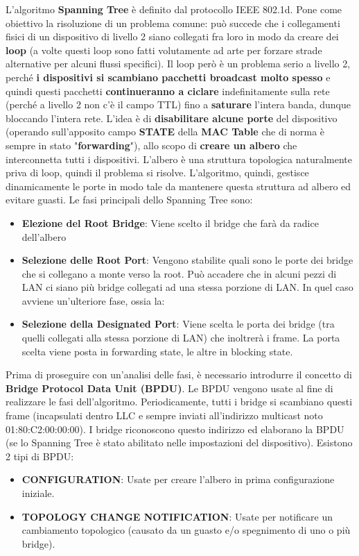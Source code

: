 \documentclass[12pt]{article}
\begin{document}
L'algoritmo \textbf{Spanning Tree} è definito dal protocollo IEEE 802.1d. Pone come obiettivo la risoluzione di un problema comune: può succede che i collegamenti fisici di un dispositivo di livello 2 siano collegati fra loro in modo da creare dei \textbf{loop} (a volte questi loop sono fatti volutamente ad arte per forzare strade alternative per alcuni flussi specifici). Il loop però è un problema serio a livello 2, perché \textbf{i dispositivi si scambiano pacchetti broadcast molto spesso} e quindi questi pacchetti \textbf{continueranno a ciclare} indefinitamente sulla rete (perché a livello 2 non c'è il campo TTL) fino a \textbf{saturare} l'intera banda, dunque bloccando l'intera rete. L'idea è di \textbf{disabilitare alcune porte} del dispositivo (operando sull'apposito campo \textbf{STATE} della \textbf{MAC Table} che di norma è sempre in stato "\textbf{forwarding}"), allo scopo di \textbf{creare un albero} che interconnetta tutti i dispositivi. L'albero è una struttura topologica naturalmente priva di loop, quindi il problema si risolve. L'algoritmo, quindi, gestisce dinamicamente le porte in modo tale da mantenere questa struttura ad albero ed evitare guasti. Le fasi principali dello Spanning Tree sono:
\begin{itemize}
    \item \textbf{Elezione del Root Bridge}: Viene scelto il bridge che farà da radice dell'albero
    \item \textbf{Selezione delle Root Port}: Vengono stabilite quali sono le porte dei bridge che si collegano a monte verso la root. Può accadere che in alcuni pezzi di LAN ci siano più bridge collegati ad una stessa porzione di LAN. In quel caso avviene un'ulteriore fase, ossia la:
    \item \textbf{Selezione della Designated Port}: Viene scelta le porta dei bridge (tra quelli collegati alla stessa porzione di LAN) che inoltrerà i frame. La porta scelta viene posta in forwarding state, le altre in blocking state.
\end{itemize}
Prima di proseguire con un'analisi delle fasi, è necessario introdurre il concetto di \textbf{Bridge Protocol Data Unit (BPDU)}. Le BPDU vengono usate al fine di realizzare le fasi dell'algoritmo. Periodicamente, tutti i bridge si scambiano questi frame (incapsulati dentro LLC e sempre inviati all'indirizzo multicast noto 01:80:C2:00:00:00). I bridge riconoscono questo indirizzo ed elaborano la BPDU (se lo Spanning Tree è stato abilitato nelle impostazioni del dispositivo). Esistono 2 tipi di BPDU:
\begin{itemize}
    \item \textbf{CONFIGURATION}: Usate per creare l'albero in prima configurazione iniziale.
    \item \textbf{TOPOLOGY CHANGE NOTIFICATION}: Usate per notificare un cambiamento topologico (causato da un guasto e/o spegnimento di uno o più bridge).
\end{itemize}
\end{document}
